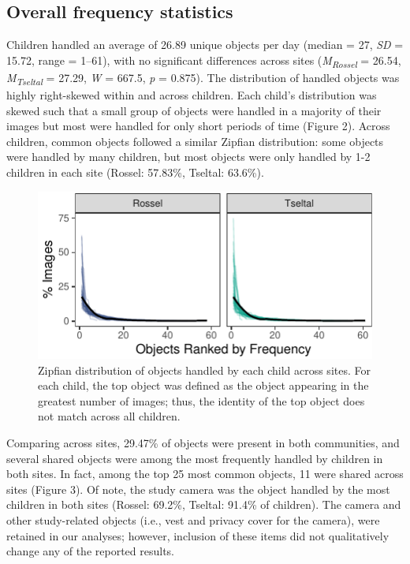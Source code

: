 \documentclass[10pt, letterpaper]{article}
\newenvironment{CodeChunk}{}{}
\begin{document}
\hypertarget{overall-frequency-statistics}{%
\subsection{Overall frequency
statistics}\label{overall-frequency-statistics}}

Children handled an average of 26.89 unique objects per day (median =
27, \emph{SD} = 15.72, range = 1--61), with no significant differences
across sites (\emph{M}\textsubscript{\emph{Rossel}} = 26.54,
\emph{M}\textsubscript{\emph{Tseltal}} = 27.29, \emph{W} = 667.5,
\emph{p} = 0.875). The distribution of handled objects was highly
right-skewed within and across children. Each child's distribution was
skewed such that a small group of objects were handled in a majority of
their images but most were handled for only short periods of time
(Figure 2). Across children, common objects followed a similar Zipfian
distribution: some objects were handled by many children, but most
objects were only handled by 1-2 children in each site (Rossel: 57.83\%,
Tseltal: 63.6\%).

\begin{CodeChunk}
\begin{figure}[h]

{\centering \includegraphics{figs/zipfian-objects-fig-1} 

}

\caption[Zipfian distribution of objects handled by each child across sites]{Zipfian distribution of objects handled by each child across sites. For each child, the top object was defined as the object appearing in the greatest number of images; thus, the identity of the top object does not match across all children.}\label{fig:zipfian-objects-fig}
\end{figure}
\end{CodeChunk}

Comparing across sites, 29.47\% of objects were present in both
communities, and several shared objects were among the most frequently
handled by children in both sites. In fact, among the top 25 most common
objects, 11 were shared across sites (Figure 3). Of note, the study
camera was the object handled by the most children in both sites
(Rossel: 69.2\%, Tseltal: 91.4\% of children). The camera and other
study-related objects (i.e., vest and privacy cover for the camera),
were retained in our analyses; however, inclusion of these items did not
qualitatively change any of the reported results.
\end{document}

